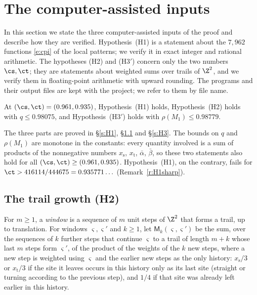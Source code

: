 \section{The computer-assisted inputs}\label{s:computer}

In this section we state the three computer-assisted inputs of the proof and describe how they are verified. Hypothesis~(H1) is a statement about the $7{,}962$ functions \eqref{e:cpi} of the local patterns; we verify it in exact integer and rational arithmetic. The hypotheses (H2) and (H3$'$) concern only the two numbers $\cs, \ct$; they are statements about weighted sums over trails of $\Z^2$, and we verify them in floating-point arithmetic with upward rounding. The programs and their output files are kept with the project; we refer to them by file name.

\begin{theorem}\label{t:inputs}
At $(\cs, \ct) = (0.961, 0.935)$, Hypothesis~(H1) holds, Hypothesis~(H2) holds with $q \le 0.98075$, and Hypothesis~(H3$'$) holds with $\rho(M_1) \le 0.98779$.
\end{theorem}

The three parts are proved in \S\ref{s:H1}, \S\ref{s:H2} and \S\ref{s:H3}. The bounds on $q$ and $\rho(M_1)$ are monotone in the constants: every quantity involved is a sum of products of the nonnegative numbers $x_{\mathrm s}$, $x_{\mathrm t}$, $\bar\alpha$, $\bar\beta$, so these two statements also hold for all $(\cs, \ct) \ge (0.961, 0.935)$. Hypothesis~(H1), on the contrary, fails for $\ct > 416114/444675 = 0.935771\ldots$ (Remark~\ref{r:H1sharp}).

\subsection{The trail growth (H2)}\label{s:H2}

For $m \ge 1$, a \emph{window} is a sequence of $m$ unit steps of $\Z^2$ that forms a trail, up to translation. For windows $\varsigma, \varsigma'$ and $k \ge 1$, let $\mathsf M_k(\varsigma, \varsigma')$ be the sum, over the sequences of $k$ further steps that continue $\varsigma$ to a trail of length $m + k$ whose last $m$ steps form $\varsigma'$, of the product of the weights of the $k$ new steps, where a new step is weighted using $\varsigma$ and the earlier new steps as the only history: $x_{\mathrm s}/3$ or $x_{\mathrm t}/3$ if the site it leaves occurs in this history only as its last site (straight or turning according to the previous step), and $1/4$ if that site was already left earlier in this history.

